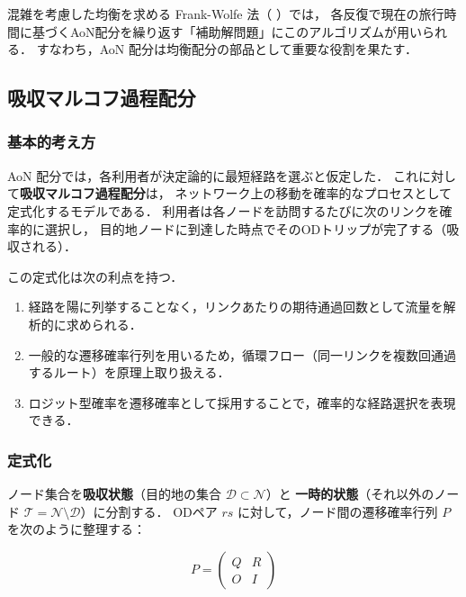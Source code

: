 混雑を考慮した均衡を求める Frank-Wolfe 法（ ）では，
各反復で現在の旅行時間に基づくAoN配分を繰り返す「補助解問題」にこのアルゴリズムが用いられる．
すなわち，AoN 配分は均衡配分の部品として重要な役割を果たす．

\subsection{吸収マルコフ過程配分}
\label{subsec:markov-assignment}

\subsubsection*{基本的考え方}

AoN 配分では，各利用者が決定論的に最短経路を選ぶと仮定した．
これに対して\textbf{吸収マルコフ過程配分}は，
ネットワーク上の移動を確率的なプロセスとして定式化するモデルである\cite{Akamatsu1996}．
利用者は各ノードを訪問するたびに次のリンクを確率的に選択し，
目的地ノードに到達した時点でそのODトリップが完了する（吸収される）．

この定式化は次の利点を持つ．
\begin{enumerate}
  \item 経路を陽に列挙することなく，リンクあたりの期待通過回数として流量を解析的に求められる．
  \item 一般的な遷移確率行列を用いるため，循環フロー（同一リンクを複数回通過するルート）を原理上取り扱える\cite{Akamatsu1996}．
  \item ロジット型確率を遷移確率として採用することで，確率的な経路選択を表現できる．
\end{enumerate}

\subsubsection*{定式化}

ノード集合を\textbf{吸収状態}（目的地の集合 $\mathcal{D} \subset \mathcal{N}$）と
\textbf{一時的状態}（それ以外のノード $\mathcal{T} = \mathcal{N} \setminus \mathcal{D}$）に分割する．
ODペア $rs$ に対して，ノード間の遷移確率行列 $P$ を次のように整理する：

\begin{equation}
  P = \begin{pmatrix} Q & R \\ O & I \end{pmatrix}
  \label{eq:markov-transition}
\end{equation}

